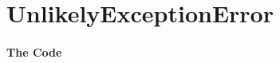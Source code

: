 \section{UnlikelyExceptionError}\label{code:UnlikelyExceptionError}

\autocite{TQUADRAT_ORG_FOUNDATION_UNLIKELYEXCEPTIONERROR}


\paragraph{The Code}\



